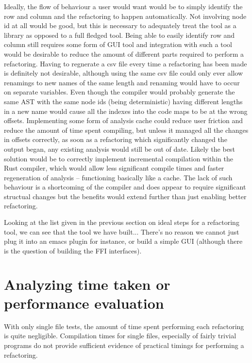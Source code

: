 Ideally, the flow of behaviour a user would want would be to simply identify the row and column and the refactoring to happen automatically. Not involving node id at all would be good, but this is necessary to adequately treat the tool as a library as opposed to a full fledged tool. Being able to easily identify row and column still requires some form of GUI tool and integration with such a tool would be desirable to reduce the amount of different parts required to perform a refactoring. Having to regnerate a csv file every time a refactoring has been made is definitely not desirable, although using the same csv file could only ever allow renamings to new names of the same length and renaming would have to occur on separate variables. Even though the compiler would probably generate the same AST with the same node ids (being deterministic) having different lengths in a new name would cause all the indexes into the code maps to be at the wrong offsets. Implementing some form of analysis cache could reduce user friction and reduce the amount of time spent compiling, but unless it managed all the changes in offsets correctly, as soon as a refactoring which significantly changed the output began, any existing analysis would still be out of date. Likely the best solution would be to correctly implement incremental compilation within the Rust compiler, which would allow less significant compile times and faster regeneration of analysis -- functioning basically like a cache. The lack of such behaviour is a shortcoming of the compiler and does appear to require significant structual changes but the benefits would extend further than just enabling better refactoring.

Looking at the list given in the previous section on ideal steps for a refactoring tool, we can see that the tool we have built... There's no reason we cannot just plug it into an emacs plugin for instance, or build a simple GUI (although there is the question of building the FFI interfaces).


\section{Analyzing time taken or performance evaluation}
With only single file tests, the amount of time spent performing each refactoring is quite negligible. Compilation times for single files, especially of fairly trivial programs do not provide sufficient evidence of practical timings for performing a refactoring.

